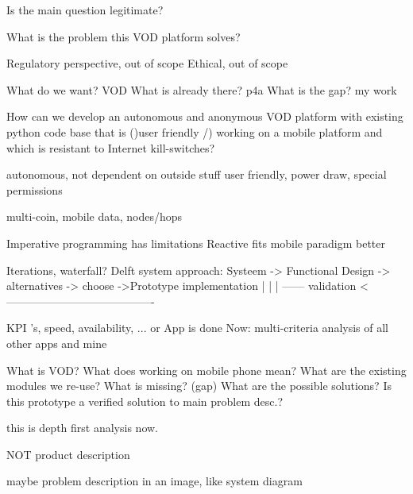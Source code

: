 Is the main question legitimate?


What is the problem this VOD platform solves?


Regulatory perspective, out of scope
Ethical, out of scope


What do we want? VOD
What is already there? p4a
What is the gap? my work

How can we develop an autonomous and anonymous VOD platform with existing python code base that is ()user friendly /) working on a mobile platform and which is resistant to Internet kill-switches?

autonomous, not dependent on outside stuff
user friendly, power draw, special permissions

multi-coin, mobile data, nodes/hops



Imperative programming has limitations
Reactive fits mobile paradigm better


Iterations, waterfall?
Delft system approach:
Systeem -> Functional Design -> alternatives -> choose ->Prototype implementation
																									 |
|																									|
------			 validation				 <----------------------------------------

KPI 's, speed, availability, ...
or
App is done
Now: multi-criteria analysis of all other apps and mine



What is VOD?
What does working on mobile phone mean?
What are the existing modules we re-use?
What is missing? (gap)
What are the possible solutions?
Is this prototype a verified solution to main problem desc.?


this is depth first analysis now.

NOT product description



maybe problem description in an image, like system diagram


